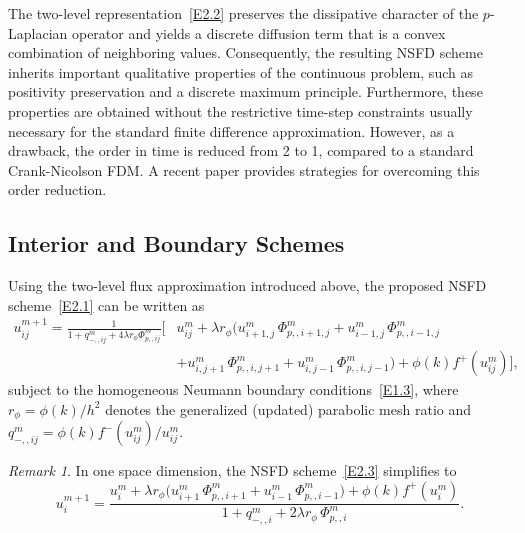 \documentclass[final,12pt,3p]{elsarticle}
\theoremstyle{plain}
\theoremstyle{definition}
\theoremstyle{remark}
\newtheorem{remark}{Remark}
\begin{document}
The two-level representation~\eqref{E2.2} preserves the dissipative character of the $p$-Laplacian opera\-tor and yields a discrete diffusion term that is a convex combination of neighboring values. 
Consequently, the resulting NSFD scheme inherits important qualitative properties of the continuous problem, such as positivity preservation and a discrete maximum principle. 
Furthermore, these properties are obtained without the restrictive time-step constraints usually necessary for the standard finite difference approximation. However, as a drawback, the order in time is reduced from 2 to 1, compared to a standard Crank-Nicolson FDM.
A recent paper \cite{hoang2026generalized} provides strategies for overcoming this order reduction.

\subsection{Interior and Boundary Schemes}\label{S2.3}

Using the two-level flux approximation introduced above, the proposed NSFD scheme~\eqref{E2.1} can be written as
\begin{equation}\label{E2.3}
\begin{aligned}
u_{ij}^{m+1} = \frac{1}{1 + q_{-,,ij}^m + 4\lambda r_\phi \Phi_{p,,ij}^m} \Big[
&u_{ij}^m + \lambda r_\phi \Big(u_{i+1,j}^m\,\Phi_{p,,i+1,j}^m 
+ u_{i-1,j}^m\,\Phi_{p,,i-1,j}^m\\
&+ u_{i,j+1}^m\,\Phi_{p,,i,j+1}^m 
+ u_{i,j-1}^m\,\Phi_{p,,i,j-1}^m\Big) + \phi(k) f^+(u_{ij}^m) %
\Big],
\end{aligned}
\end{equation}
subject to the homogeneous Neumann boundary conditions~\eqref{E1.3}, where $r_\phi=\phi(k)/h^2$ denotes the generalized (updated) parabolic mesh ratio and $q_{-,,ij}^m = \phi(k) f^-(u_{ij}^m) / u_{ij}^m$. %

\begin{remark}\label{R2}
In one space dimension, the NSFD scheme~\eqref{E2.3} simplifies to
\begin{equation}\label{E2.4}
   u_{i}^{m+1} = \frac{u_{i}^m + \lambda r_\phi \big(u_{i+1}^m\,\Phi_{p,,i+1}^m 
   + u_{i-1}^m\,\Phi_{p,,i-1}^m\big) + \phi(k) f^+(u_{i}^m)}{1 + q_{-,,i}^m + 2\lambda r_\phi\,\Phi_{p,,i}^m}. %
\end{equation}
\end{remark}
\end{document}
